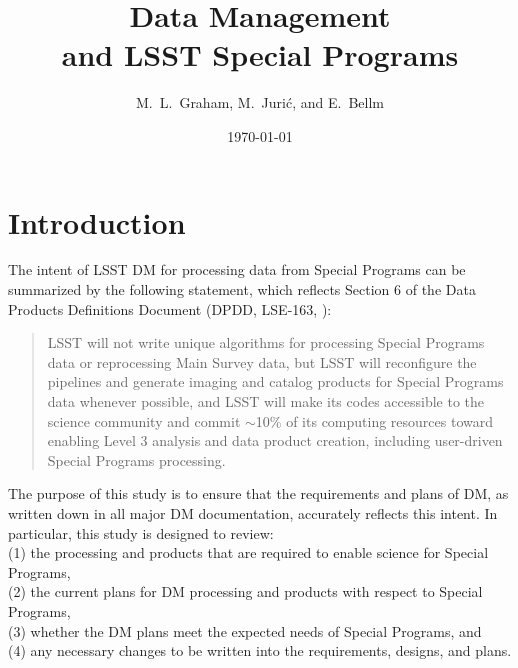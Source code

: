 \documentclass[DM,lsstdraft,toc]{lsstdoc}
\title[LSST Special Programs]{Data Management \\ and LSST Special Programs}
\author{M.~L.~Graham, M.~Juri\'{c}, and E.~Bellm}
\date{\today}
\begin{document}
\maketitle




\section{Introduction} \label{sec:intro}

The intent of LSST DM for processing data from Special Programs can be summarized by the following statement, which reflects Section 6 of the Data Products Definitions Document (DPDD, LSE-163, \cite{LSE-163}):

\vspace{-20pt}
\begin{quote}
LSST will not write unique algorithms for processing Special Programs data or reprocessing Main Survey data, but LSST will reconfigure the pipelines and generate imaging and catalog products for Special Programs data whenever possible, and LSST will make its codes accessible to the science community and commit $\sim$10\% of its computing resources toward enabling Level 3 analysis and data product creation, including user-driven Special Programs processing.
\end{quote}

\noindent The purpose of this study is to ensure that the requirements and plans of DM, as written down in all major DM documentation, accurately reflects this intent. In particular, this study is designed to review: \\
(1) the processing and products that are required to enable science for Special Programs, \\
(2) the current plans for DM processing and products with respect to Special Programs, \\
(3) whether the DM plans meet the expected needs of Special Programs, and \\
(4) any necessary changes to be written into the requirements, designs, and plans.
\end{document}
